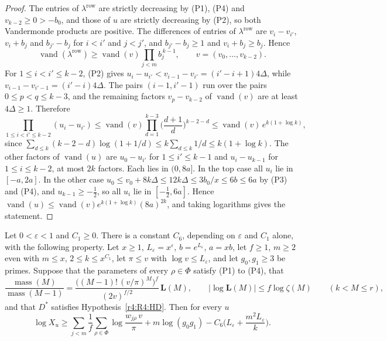 \begin{proof}
The entries of $\lambda^{\mathrm{row}}$ are strictly decreasing by (P1), (P4) and $v_{k-2}\ge0>-b_0$, and those of $u$ are strictly decreasing by (P2), so both Vandermonde products are positive. The differences of entries of $\lambda^{\mathrm{row}}$ are $v_i-v_{i'}$, $v_i+b_j$ and $b_{j'}-b_j$ for $i<i'$ and $j<j'$, and $b_{j'}-b_j\ge1$ and $v_i+b_j\ge b_j$. Hence
\[
\operatorname{vand}(\lambda^{\mathrm{row}})\ge\operatorname{vand}(v)\prod_{j<m}b_j^{\,k-1},\qquad v=(v_0,\dots,v_{k-2}).
\]
For $1\le i<i'\le k-2$, (P2) gives $u_i-u_{i'}<v_{i-1}-v_{i'}=(i'-i+1)4\Delta$, while $v_{i-1}-v_{i'-1}=(i'-i)4\Delta$. The pairs $(i-1,i'-1)$ run over the pairs $0\le p<q\le k-3$, and the remaining factors $v_p-v_{k-2}$ of $\operatorname{vand}(v)$ are at least $4\Delta\ge1$. Therefore
\[
\prod_{1\le i<i'\le k-2}(u_i-u_{i'})\le\operatorname{vand}(v)\prod_{d=1}^{k-3}\Big(\frac{d+1}d\Big)^{k-2-d}\le\operatorname{vand}(v)\,e^{k(1+\log k)},
\]
since $\sum_{d\le k}(k-2-d)\log(1+1/d)\le k\sum_{d\le k}1/d\le k(1+\log k)$. The other factors of $\operatorname{vand}(u)$ are $u_0-u_{i'}$ for $1\le i'\le k-1$ and $u_i-u_{k-1}$ for $1\le i\le k-2$, at most $2k$ factors. Each lies in $(0,8a]$. In the top case all $u_i$ lie in $[-a,2a]$. In the other case $u_0\le v_0+8k\Delta\le12k\Delta\le3b_0/x\le6b\le6a$ by (P3) and (P4), and $u_{k-1}\ge-\frac12$, so all $u_i$ lie in $[-\frac12,6a]$. Hence $\operatorname{vand}(u)\le\operatorname{vand}(v)e^{k(1+\log k)}(8a)^{2k}$, and taking logarithms gives the statement.
\end{proof}

\begin{proposition}\label{r4:R4:weyl}
Let $0<\varepsilon<1$ and $C_1\ge0$. There is a constant $C_6$, depending on $\varepsilon$ and $C_1$ alone, with the following property. Let $x\ge1$, $L_\varepsilon=x^\varepsilon$, $b=e^{L_\varepsilon}$, $a=xb$, let $f\ge1$, $m\ge2$ even with $m\le x$, $2\le k\le x^{C_1}$, let $\pi\le v$ with $\log v\le L_\varepsilon$, and let $g_0,g_1\ge3$ be primes. Suppose that the parameters of every $\rho\in\Phi$ satisfy (P1) to (P4), that
\[
\frac{\operatorname{mass}(M)}{\operatorname{mass}(M-1)}=\frac{\big((M-1)!\,(v/\pi)^M\big)^f}{(2v)^{f/2}}\,\mathbf L(M),\qquad\lvert\log\mathbf L(M)\rvert\le f\log\zeta(M)\qquad(k<M\le r),
\]
and that $D^*$ satisfies Hypothesis~\ref{r4:R4:HD}. Then for every $u$
\[
\log X_u\ge\sum_{j<m}\frac1f\sum_{\rho\in\Phi}\log\frac{w_{j\rho}\,v}\pi+m\log(g_0g_1)-C_6\Big(L_\varepsilon+\frac{m^2L_\varepsilon}k\Big).
\]
\end{proposition}

